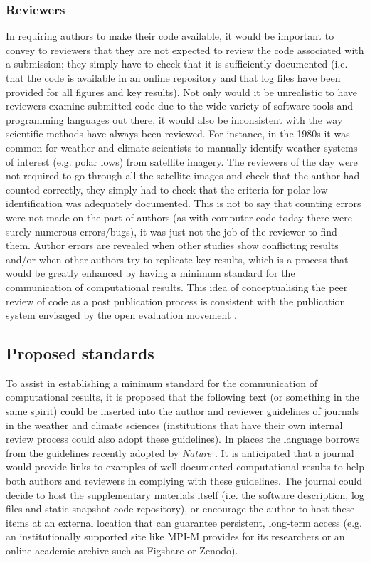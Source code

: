 \subsubsection{Reviewers}

In requiring authors to make their code available, it would be important to convey to reviewers that they are not expected to review the code associated with a submission; they simply have to check that it is sufficiently documented (i.e. that the code is available in an online repository and that log files have been provided for all figures and key results). Not only would it be unrealistic to have reviewers examine submitted code due to the wide variety of software tools and programming languages out there, it would also be inconsistent with the way scientific methods have always been reviewed. For instance, in the 1980s it was common for weather and climate scientists to manually identify weather systems of interest (e.g. polar lows) from satellite imagery. The reviewers of the day were not required to go through all the satellite images and check that the author had counted correctly, they simply had to check that the criteria for polar low identification was adequately documented. This is not to say that counting errors were not made on the part of authors (as with computer code today there were surely numerous errors/bugs), it was just not the job of the reviewer to find them. Author errors are revealed when other studies show conflicting results and/or when other authors try to replicate key results, which is a process that would be greatly enhanced by having a minimum standard for the communication of computational results. This idea of conceptualising the peer review of code as a post publication process is consistent with the publication system envisaged by the open evaluation movement \citep[e.g.][]{Kriegeskorte2012}. 
  
\subsection{Proposed standards}

To assist in establishing a minimum standard for the communication of computational results, it is proposed that the following text (or something in the same spirit) could be inserted into the author and reviewer guidelines of journals in the weather and climate sciences (institutions that have their own internal review process could also adopt these guidelines). In places the language borrows from the guidelines recently adopted by \textit{Nature} \citep{Nature2014}. It is anticipated that a journal would provide links to examples of well documented computational results to help both authors and reviewers in complying with these guidelines. The journal could decide to host the supplementary materials itself (i.e. the software description, log files and static snapshot code repository), or encourage the author to host these items at an external location that can guarantee persistent, long-term access (e.g. an institutionally supported site like MPI-M provides for its researchers or an online academic archive such as Figshare or Zenodo).

